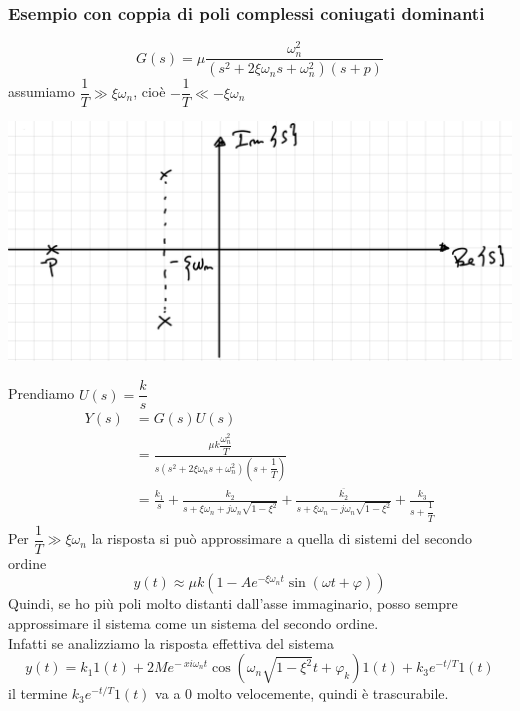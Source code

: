 \documentclass{article}
\numberwithin{equation}{subsection}
\begin{document}
\subsubsection{Esempio con coppia di poli complessi coniugati dominanti} 
\[
    G(s) = \mu \frac{\omega_n^2}{(s^2+2\xi\omega_n s +\omega_n^2)(s+p)}
\]
assumiamo $\dfrac{1}{T} \gg \xi \omega_n$, cioè $-\dfrac{1}{T} \ll - \xi \omega_n$
\begin{center}
    \includegraphics[scale=0.22]{Images/Esempio_polo_dominante.png}
\end{center}
Prendiamo $U(s) = \dfrac{k}{s}$
\begin{align*}
    Y(s) 
    &= G(s) U(s)\\
    &=\frac{\mu k \dfrac{\omega_n^2}{T}}{s(s^2+2\xi\omega_ns + \omega_n^2)\left(s+\dfrac{1}{T}\right)}\\
    &= \frac{k_1}{s} + \frac{k_2}{s+\xi\omega_n+j\omega_n \sqrt{1-\xi^2}} + \frac{\overline{k_2}}{s+\xi\omega_n-j\omega_n \sqrt{1-\xi^2}} + \frac{k_3}{s+\dfrac{1}{T}}
\end{align*}
Per $\dfrac{1}{T} \gg \xi \omega_n$ la risposta si può approssimare a quella di sistemi del secondo ordine
\[
    y(t) \approx \mu k \left(1-A e^{-\xi \omega_n t} \sin(\omega t + \varphi)\right)
\]
Quindi, se ho più poli molto distanti dall'asse immaginario, posso sempre approssimare il sistema come un sistema del secondo ordine.
\vspace*{0.2cm}\\
Infatti se analizziamo la risposta effettiva del sistema
\[
    y(t) = k_1 1(t) + 2M e^{-\ xi \omega_n t} \cos(\omega_n \sqrt{1 - \xi^2}t + \varphi_k) 1(t) + k_3 e^{-t/T} 1(t)
\]
il termine $k_3 e^{-t/T} 1(t)$ va a 0 molto velocemente, quindi è trascurabile.
\end{document}
